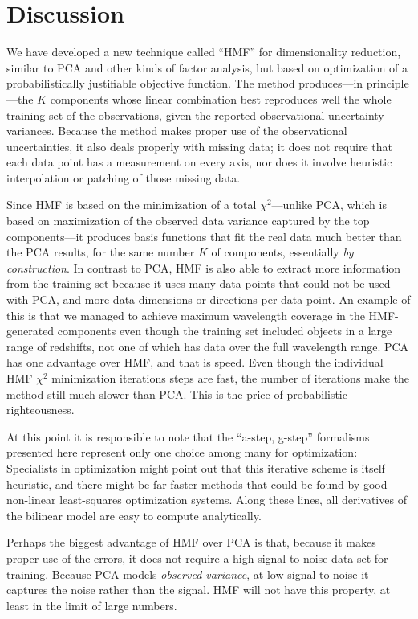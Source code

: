 \documentclass[12pt,preprint]{aastex}
\begin{document}
\section{Discussion}\label{sec:discussion}
We have developed a new technique called ``HMF'' for dimensionality
reduction, similar to PCA and other kinds of factor analysis, but
based on optimization of a probabilistically justifiable objective
function.  The method produces---in principle---the $K$ components
whose linear combination best reproduces well the whole training set
of the observations, given the reported observational uncertainty
variances.  Because the method makes proper use of the observational
uncertainties, it also deals properly with missing data; it does not
require that each data point has a measurement on every axis, nor does
it involve heuristic interpolation or patching of those missing data.

Since HMF is based on the minimization of a total $\chi^2$---unlike
PCA, which is based on maximization of the observed data variance
captured by the top components---it produces basis functions that fit
the real data much better than the PCA results, for the same number
$K$ of components, essentially \emph{by construction}.  In contrast to PCA,
HMF is also able to extract more information from the training set
because it uses many data points that could not be used with PCA, and
more data dimensions or directions per data point. An example of this
is that we managed to achieve maximum wavelength coverage in the
HMF-generated components even though the training set included objects
in a large range of redshifts, not one of which has data over the full
wavelength range.  PCA has one advantage over HMF, and that is
speed. Even though the individual HMF $\chi^2$ minimization iterations
steps are fast, the number of iterations make the method still much
slower than PCA. This is the price of probabilistic righteousness.

At this point it is responsible to note that the ``a-step, g-step''
formalisms presented here represent only one choice among many for
optimization: Specialists in optimization might point out that this
iterative scheme is itself heuristic, and there might be far faster
methods that could be found by good non-linear least-squares
optimization systems.  Along these lines, all derivatives of the
bilinear model are easy to compute analytically.

Perhaps the biggest advantage of HMF over PCA is that, because it
makes proper use of the errors, it does not require a high
signal-to-noise data set for training.  Because PCA models
\emph{observed variance}, at low signal-to-noise it captures the noise
rather than the signal.  HMF will not have this property, at least in
the limit of large numbers.
\end{document}
